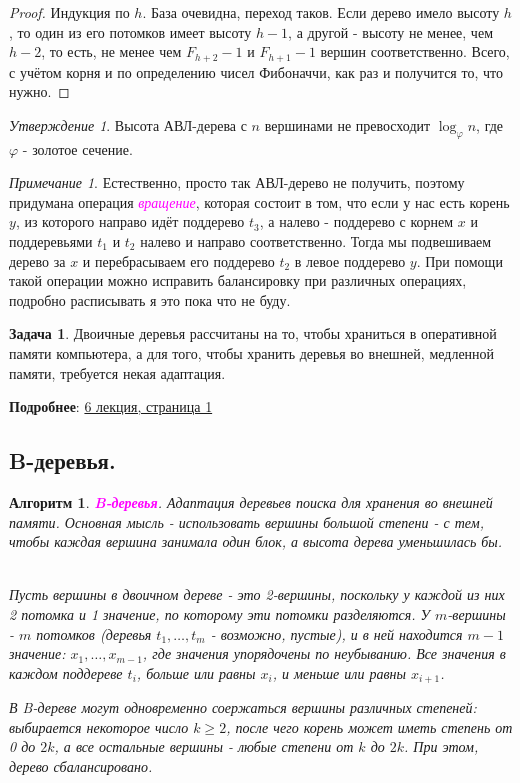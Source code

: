 \documentclass[a4paper]{article}
\theoremstyle{indented}
\newtheorem{alg}{Алгоритм}
\theoremstyle{definition}
\newtheorem{prob}{Задача}
\theoremstyle{remark}
\newtheorem{remark}{Примечание}
\newtheorem{stat}{Утверждение}
\begin{document}
\begin{proof}
    Индукция по $h$. База очевидна, переход таков. Если дерево имело высоту $h$, то один из его потомков имеет высоту $h-1$, а другой - высоту не менее, чем $h-2$, то есть, не менее чем $F_{h+2}-1$ и $F_{h+1}-1$ вершин соответственно. Всего, с учётом корня и по определению чисел Фибоначчи, как раз и получится то, что нужно.
\end{proof}

\begin{stat}
    Высота АВЛ-дерева с $n$ вершинами не превосходит $\log_\varphi n$, где $\varphi$ - золотое сечение.
\end{stat}

\begin{remark}
    Естественно, просто так АВЛ-дерево не получить, поэтому придумана операция \textcolor{magenta}{\hypertarget{d16}{\textit{вращение}}}, которая состоит в том, что если у нас есть корень $y$, из которого направо идёт поддерево $t_3$, а налево - поддерево с корнем $x$ и поддеревьями $t_1$ и $t_2$ налево и направо соответственно. Тогда мы подвешиваем дерево за $x$ и перебрасываем его поддерево $t_2$ в левое поддерево $y$. При помощи такой операции можно исправить балансировку при различных операциях, подробно расписывать я это пока что не буду.
\end{remark}

\begin{prob}
    Двоичные деревья рассчитаны на то, чтобы храниться в оперативной памяти компьютера, а для того, чтобы хранить деревья во внешней, медленной памяти, требуется некая адаптация.
\end{prob}

\textbf{Подробнее}: \href{https://users.math-cs.spbu.ru/~okhotin/teaching/algorithms_2020/okhotin_algorithms_2020_l6.pdf}{6 лекция, страница 1}

\subsection{B-деревья.}

\begin{alg}
    \textcolor{magenta}{\hypertarget{t29}{\textbf{B-деревья}}}. Адаптация деревьев поиска для хранения во внешней памяти. Основная мысль - использовать вершины большой степени - с тем, чтобы каждая вершина занимала один блок, а высота дерева уменьшилась бы. \ 

    Пусть вершины в двоичном дереве - это 2-вершины, поскольку у каждой из них 2 потомка и 1 значение, по которому эти потомки разделяются. У $m$-вершины - $m$ потомков (деревья $t_1, \ldots, t_m$ - возможно, пустые), и в ней находится $m-1$ значение: $x_1, \ldots, x_{m-1}$, где значения упорядочены по неубыванию. Все значения в каждом поддереве $t_i$, больше или равны $x_i$, и меньше или равны $x_{i+1}$. \ 

    В B-дереве могут одновременно соержаться вершины различных степеней: выбирается некоторое число $k\geq 2$, после чего корень может иметь степень от 0 до $2k$, а все остальные вершины - любые степени от $k$ до $2k$. При этом, дерево сбалансировано.
\end{alg}
\end{document}
